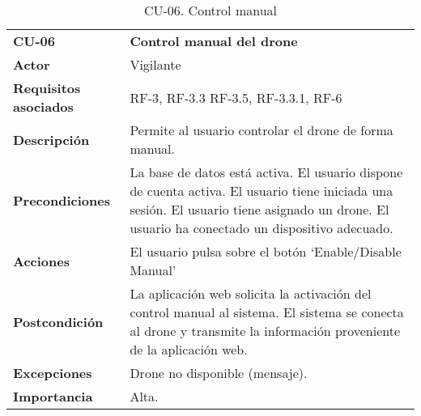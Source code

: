 \begin{table}[H]
	\begin{center}
		\begin{tabular}{m{3cm} | m{10cm}}\hline
			\toprule
			\textbf{CU-06} & \textbf{Control manual del drone}\\
			\otoprule
			\textbf{Actor} & Vigilante\\
			\textbf{Requisitos asociados} & RF-3, RF-3.3 RF-3.5, RF-3.3.1, RF-6\\
			\textbf{Descripción} & Permite al usuario controlar el drone de forma manual.\\
			\textbf{Precondiciones} & La base de datos está activa. El usuario dispone de cuenta activa. El usuario tiene iniciada una sesión. El usuario tiene asignado un drone. El usuario ha conectado un dispositivo adecuado.\\
			\textbf{Acciones} & El usuario pulsa sobre el botón `Enable/Disable Manual'\\
											
			\textbf{Postcondición} & La aplicación web solicita la activación del control manual al sistema. El sistema se conecta al drone y transmite la información proveniente de la aplicación web.\\
			\textbf{Excepciones} & Drone no disponible (mensaje).\\
			\textbf{Importancia} & Alta.\\
			\hline
			\bottomrule
		\end{tabular}
		\caption{CU-06. Control manual}
		\label{tb:CU06}
	\end{center}
\end{table}

